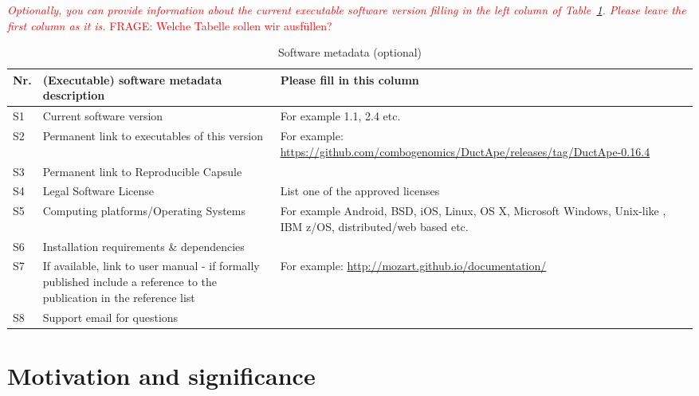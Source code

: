 \documentclass[preprint,12pt, a4paper]{elsarticle}
\begin{document}
\textcolor{red}{\textit{Optionally, you can provide information about the current executable
software version filling in the left column of
Table~\ref{executabelMetadata}. Please leave the first column as it is.} FRAGE: Welche Tabelle sollen wir ausfüllen?}

\begin{table}[!h]
\begin{tabular}{|l|p{6.5cm}|p{6.5cm}|}
\hline
\textbf{Nr.} & \textbf{(Executable) software metadata description} & \textbf{Please fill in this column} \\
\hline
S1 & Current software version & For example 1.1, 2.4 etc. \\
\hline
S2 & Permanent link to executables of this version  & For example: \url{https://github.com/combogenomics/DuctApe/releases/tag/DuctApe-0.16.4} \\
\hline
S3  & Permanent link to Reproducible Capsule & \\
\hline
S4 & Legal Software License & List one of the approved licenses \\
\hline
S5 & Computing platforms/Operating Systems & For example Android, BSD, iOS, Linux, OS X, Microsoft Windows, Unix-like , IBM z/OS, distributed/web based etc. \\
\hline
S6 & Installation requirements \& dependencies & \\
\hline
S7 & If available, link to user manual - if formally published include a reference to the publication in the reference list & For example: \url{http://mozart.github.io/documentation/} \\
\hline
S8 & Support email for questions & \\
\hline
\end{tabular}
\caption{Software metadata (optional)}
\label{executabelMetadata} 
\end{table}


\section{Motivation and significance}
\end{document}
